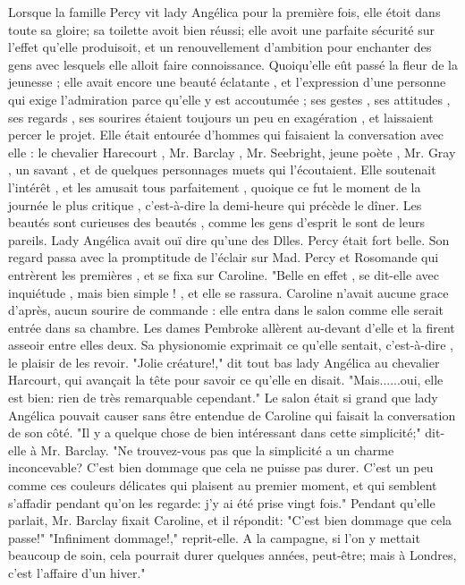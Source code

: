 Lorsque la famille Percy vit lady Angélica pour la première fois, elle étoit dans toute sa gloire; sa toilette avoit bien réussi; elle avoit une parfaite sécurité sur l'effet qu'elle produisoit, et un renouvellement d'ambition pour enchanter des gens avec lesquels elle alloit faire connoissance. Quoiqu'elle eût\setcounter{page}{530} passé la fleur de la jeunesse ; elle avait encore une beauté éclatante , et l'expression d'une personne qui exige l'admiration parce qu'elle y est accoutumée ; ses gestes , ses attitudes , ses regards , ses sourires étaient toujours un peu en exagération , et laissaient percer le projet. Elle était entourée d'hommes qui faisaient la conversation avec elle : le chevalier Harecourt , Mr. Barclay , Mr. Seebright, jeune poète , Mr. Gray , un savant , et de quelques personnages muets qui l'écoutaient. Elle soutenait l'intérêt , et les amusait tous parfaitement , quoique ce fut le moment de la journée le plus critique , c'est-à-dire la demi-heure qui précède le dîner. Les beautés sont curieuses des beautés , comme les gens d'esprit le sont de leurs pareils. Lady Angélica avait ouï dire qu'une des Dlles. Percy était fort belle. Son regard passa avec la promptitude de l'éclair sur Mad. Percy et Rosomande qui entrèrent les premières , et se fixa sur Caroline. "Belle en effet , se dit-elle avec inquiétude , mais bien simple ! , et elle se rassura. Caroline n'avait aucune grace d'après, aucun sourire de commande : elle entra dans le salon comme elle serait entrée dans sa chambre. Les dames Pembroke allèrent au-devant d'elle et la firent asseoir entre elles deux. Sa physionomie exprimait ce qu'elle sentait, c'est-à-dire , le plaisir de les revoir.\setcounter{page}{531} "Jolie créature!," dit tout bas lady Angélica au chevalier Harcourt, qui avançait la tête pour savoir ce qu'elle en disait.
"Mais......oui, elle est bien: rien de très remarquable cependant."
Le salon était si grand que lady Angélica pouvait causer sans être entendue de Caroline qui faisait la conversation de son côté.
"Il y a quelque chose de bien intéressant dans cette simplicité;" dit-elle à Mr. Barclay. "Ne trouvez-vous pas que la simplicité a un charme inconcevable? C'est bien dommage que cela ne puisse pas durer. C'est un peu comme ces couleurs délicates qui plaisent au premier moment, et qui semblent s'affadir pendant qu'on les regarde: j'y ai été prise vingt fois."
Pendant qu'elle parlait, Mr. Barclay fixait Caroline, et il répondit: "C'est bien dommage que cela passe!"
"Infiniment dommage!," reprit-elle. A la campagne, si l'on y mettait beaucoup de soin, cela pourrait durer quelques années, peut-être; mais à Londres, c'est l'affaire d'un hiver."

